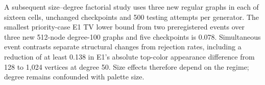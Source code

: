 A subsequent size--degree factorial study uses three new regular graphs in
each of sixteen cells, unchanged checkpoints and 500 testing attempts per
generator. The smallest priority-case E1 TV lower bound from two preregistered
events over three new 512-node degree-100 graphs and five checkpoints is 0.078.
Simultaneous event contrasts separate structural changes from rejection rates,
including a reduction of at least 0.138 in E1's absolute top-color
appearance difference from 128 to 1,024 vertices at degree 50. Size effects
therefore depend on the regime; degree remains confounded with palette size.

